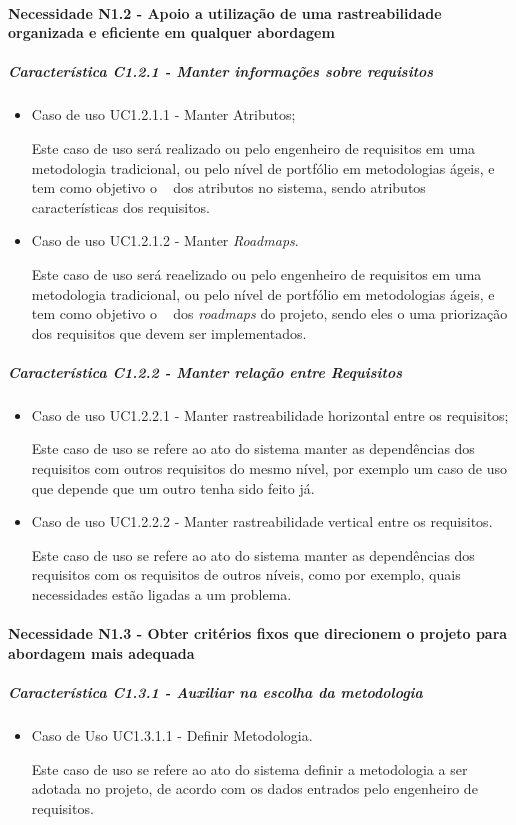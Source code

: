 \paragraph{Necessidade N1.2 - Apoio a utilização de uma rastreabilidade organizada e eficiente em qualquer abordagem}
	\subparagraph{Característica C1.2.1 - Manter informações sobre requisitos}
		\begin{itemize}
			
			\item Caso de uso UC1.2.1.1 - Manter Atributos;

				Este caso de uso será realizado ou pelo engenheiro de requisitos em uma metodologia tradicional, ou pelo nível de portfólio em metodologias ágeis, e tem como objetivo o \CRUD~ dos atributos no sistema, sendo atributos características dos requisitos.
			
			\item Caso de uso UC1.2.1.2 - Manter \textit{Roadmaps}.

				Este caso de uso será reaelizado ou pelo engenheiro de requisitos em uma metodologia tradicional, ou pelo nível de portfólio em metodologias ágeis, e tem como objetivo o \CRUD~ dos \textit{roadmaps} do projeto, sendo eles o uma priorização dos requisitos que devem ser implementados.

		\end{itemize}

	\subparagraph{Característica C1.2.2 - Manter relação entre Requisitos}
		\begin{itemize}
			
			\item Caso de uso UC1.2.2.1 - Manter rastreabilidade horizontal entre os requisitos;

				Este caso de uso se refere ao ato do sistema manter as dependências dos requisitos com outros requisitos do mesmo nível, por exemplo um caso de uso que depende que um outro tenha sido feito já.
			
			\item Caso de uso UC1.2.2.2 - Manter rastreabilidade vertical entre os requisitos.

				Este caso de uso se refere ao ato do sistema manter as dependências dos requisitos com os requisitos de outros níveis, como por exemplo, quais necessidades estão ligadas a um problema.
		\end{itemize}

\paragraph{Necessidade N1.3 - Obter critérios fixos que direcionem o projeto para abordagem mais adequada}
	\subparagraph{Característica C1.3.1 - Auxiliar na escolha da metodologia}
		\begin{itemize}
			
			\item Caso de Uso UC1.3.1.1 - Definir Metodologia.

				Este caso de uso se refere ao ato do sistema definir a metodologia a ser adotada no projeto, de acordo com os dados entrados pelo engenheiro de requisitos.
		\end{itemize}

